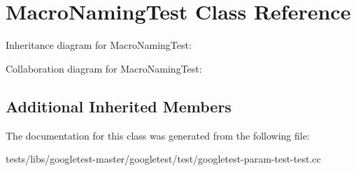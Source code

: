 \hypertarget{classMacroNamingTest}{}\section{Macro\+Naming\+Test Class Reference}
\label{classMacroNamingTest}


Inheritance diagram for Macro\+Naming\+Test\+:


Collaboration diagram for Macro\+Naming\+Test\+:
\subsection*{Additional Inherited Members}


The documentation for this class was generated from the following file\+:\begin{DoxyCompactItemize}
\item 
tests/libs/googletest-\/master/googletest/test/googletest-\/param-\/test-\/test.\+cc\end{DoxyCompactItemize}
